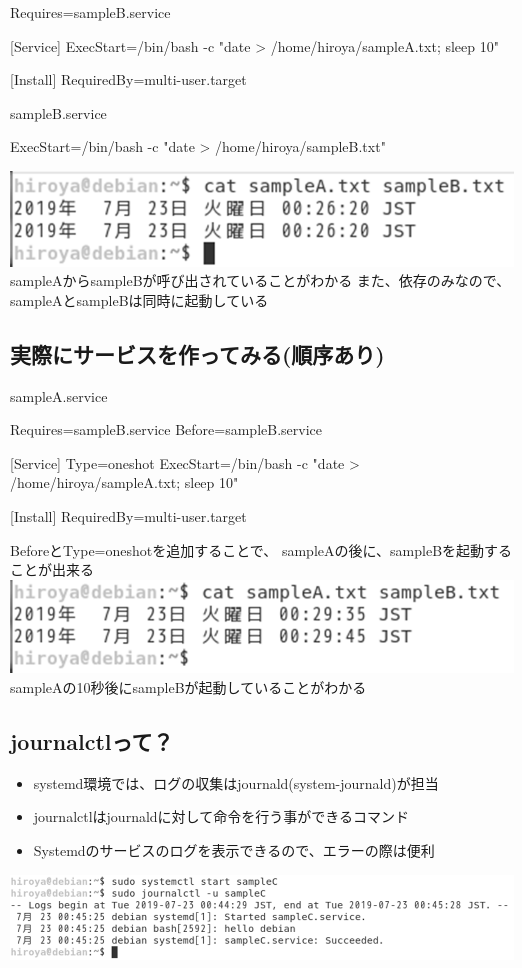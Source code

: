 \documentclass[mingoth,a4paper]{jsarticle}
\begin{document}
\begin{commandline}
[Unit]
Requires=sampleB.service

[Service]
ExecStart=/bin/bash -c "date > /home/hiroya/sampleA.txt; sleep 10"

[Install]
RequiredBy=multi-user.target

\end{commandline}
sampleB.service
\begin{commandline}
[Service]
ExecStart=/bin/bash -c "date > /home/hiroya/sampleB.txt"
\end{commandline}
\includegraphics[keepaspectratio,width=0.5\hsize]{image201905-kansai/samplea04_gray.png}
 \\
sampleAからsampleBが呼び出されていることがわかる
また、依存のみなので、sampleAとsampleBは同時に起動している

\subsection{実際にサービスを作ってみる(順序あり)}
sampleA.service
\begin{commandline}
[Unit]
Requires=sampleB.service
Before=sampleB.service

[Service]
Type=oneshot
ExecStart=/bin/bash -c "date > /home/hiroya/sampleA.txt; sleep 10"

[Install]
RequiredBy=multi-user.target
\end{commandline}
BeforeとType=oneshotを追加することで、
sampleAの後に、sampleBを起動することが出来る
 \\
\includegraphics[keepaspectratio,width=0.5\hsize]{image201905-kansai/samplea05_gray.png}
 \\
sampleAの10秒後にsampleBが起動していることがわかる


\subsection{journalctlって？}
\begin{itemize}
 \item systemd環境では、ログの収集はjournald(system-journald)が担当
 \item journalctlはjournaldに対して命令を行う事ができるコマンド
 \item Systemdのサービスのログを表示できるので、エラーの際は便利
\end{itemize}
\includegraphics[keepaspectratio,width=0.7\hsize]{image201905-kansai/journalctl01_gray.png}
\end{document}
